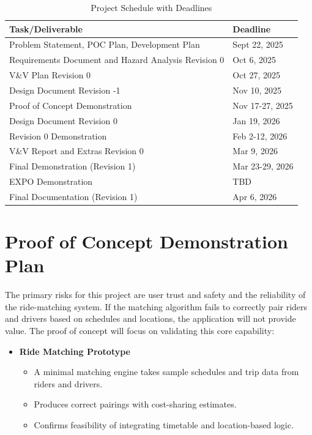 \documentclass{article}
\begin{document}
\begin{table}[h!]
  \centering
  \begin{tabular}{|l|l|}
  \hline
  \textbf{Task/Deliverable} & \textbf{Deadline} \\
  \hline
  Problem Statement, POC Plan, Development Plan & Sept 22, 2025 \\
  \hline
  Requirements Document and Hazard Analysis Revision 0 & Oct 6, 2025 \\
  \hline
  V\&V Plan Revision 0  & Oct 27, 2025 \\
  \hline
  Design Document Revision -1  & Nov 10, 2025 \\
  \hline
  Proof of Concept Demonstration & Nov 17-27, 2025 \\
  \hline
  Design Document Revision 0           & Jan 19, 2026 \\
  \hline
  Revision 0 Demonstration & Feb 2-12, 2026 \\
  \hline
  V\&V Report and Extras Revision 0 & Mar 9, 2026 \\
  \hline
  Final Demonstration (Revision 1) & Mar 23-29, 2026 \\
  \hline
  EXPO Demonstration & TBD \\
  \hline
  Final Documentation (Revision 1) & Apr 6, 2026 \\
  \hline
  \end{tabular}
  \caption{Project Schedule with Deadlines}
  \label{tab:schedule}
  \end{table}

\section{Proof of Concept Demonstration Plan}


The primary risks for this project are user trust and safety and the reliability of the ride-matching system.
If the matching algorithm fails to correctly pair riders and drivers based on schedules and locations, the application will not provide value.
The proof of concept will focus on validating this core capability:

\begin{itemize}
  \item \textbf{Ride Matching Prototype}
  \begin{itemize}
      \item A minimal matching engine takes sample schedules and trip data from riders and drivers.
      \item Produces correct pairings with cost-sharing estimates.
      \item Confirms feasibility of integrating timetable and location-based logic.
  \end{itemize}
\end{itemize}
\end{document}

